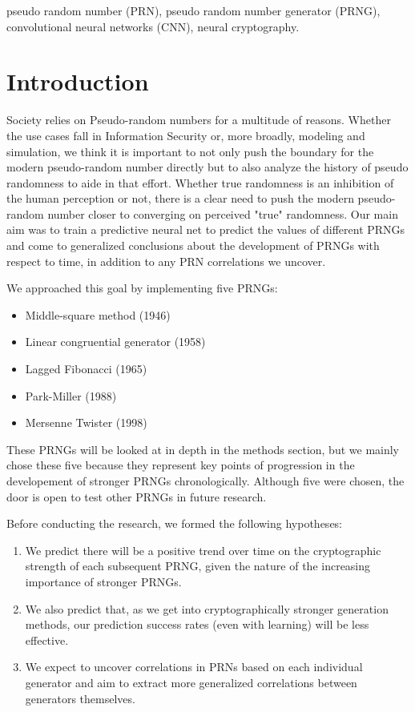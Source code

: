 \documentclass[conference]{IEEEtran}
\begin{document}
\begin{IEEEkeywords}
pseudo random number (PRN), pseudo random number generator (PRNG), convolutional neural networks (CNN), neural cryptography.
\end{IEEEkeywords}

\section{Introduction}
Society relies on Pseudo-random numbers for a multitude of reasons. Whether the use cases fall in Information Security or, more broadly, modeling and simulation, we think it is important to not only push the boundary for the modern pseudo-random number directly but to also analyze the history of pseudo randomness to aide in that effort. Whether true randomness is an inhibition of the human perception or not, there is a clear need to push the modern pseudo-random number closer to converging on perceived "true" randomness.
Our main aim was to train a predictive neural net to predict the values of different PRNGs and come to generalized conclusions about the development of PRNGs with respect to time, in addition to any PRN correlations we uncover.

We approached this goal by implementing five PRNGs:
\begin{itemize}
  \item Middle-square method (1946)
  \item Linear congruential generator (1958)
  \item Lagged Fibonacci (1965)
  \item Park-Miller (1988)
  \item Mersenne Twister (1998)
\end{itemize}

These PRNGs will be looked at in depth in the methods section, but we mainly chose these five because they represent key points of progression in the developement of stronger PRNGs chronologically. Although five were chosen, the door is open to test other PRNGs in future research.

Before conducting the research, we formed the following hypotheses:
\begin{enumerate}
    \item We predict there will be a positive trend over time on the cryptographic strength of each subsequent PRNG, given the nature of the increasing importance of stronger PRNGs.
    \item We also predict that, as we get into cryptographically stronger generation methods, our prediction success rates (even with learning) will be less effective.
    \item We expect to uncover correlations in PRNs based on each individual generator and aim to extract more generalized correlations between generators themselves.
\end{enumerate}
\end{document}
